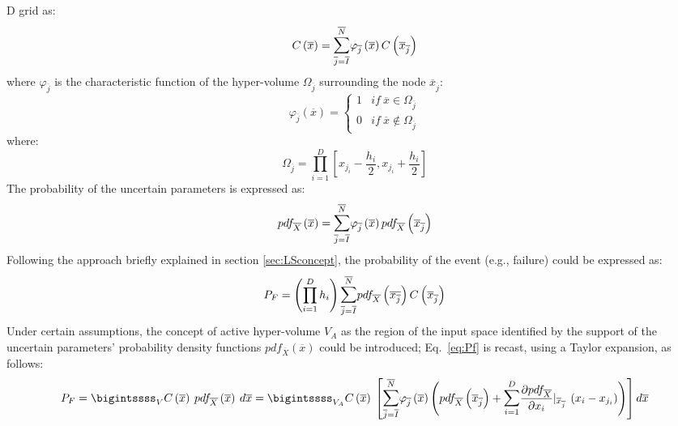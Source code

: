 D grid as:
\begin{equation}
C\left ( \overline{x} \right ) = 
\mathlarger{\sum}_{\overline{j}=\overline{I}}^{\overline{N}} \varphi_{\overline{j}}\left 
( \overline{x} \right ) C\left ( \overline{x}_{\overline{j}} \right )
\end{equation}
where $\varphi_{\overline{j}}$ is the characteristic function of the hyper-volume $\Omega_{\overline{j}}$ surrounding the node 
 $\overline{x}_{\overline{j}}$:
 \begin{equation}
 \varphi_{\overline{j}}\left ( \overline{x} \right ) = 
\left\{\begin{matrix}
1 & if \: \overline{x} \in \Omega_{\overline{j}} \\ 
0 & if \: \overline{x} \notin \Omega_{\overline{j}} 
\end{matrix}\right.
\end{equation}
where:
 \begin{equation}
 \label{eq:OmegaEq}
 \Omega_{\overline{j}} = \prod_{i=1}^{D}\left [ x_{j_{i}} - \frac{h_{i}}{2}, 
 x_{j_{i}} + \frac{h_{i}}{2}  \right ]
 \end{equation}
 The probability of the uncertain parameters is expressed as:
 \begin{equation} 
 pdf_{\overline{X}}\left ( \overline{x} \right ) = 
\mathlarger{\sum}_{\overline{j}=\overline{I}}^{\overline{N}}
\varphi_{\overline{j}}\left ( \overline{x} \right )
pdf_{\overline{X}}\left ( \overline{x}_{\overline{j}} \right )
 \end{equation}
Following the approach briefly explained in section 
\ref{sec:LSconcept}, the probability of the event (e.g., failure) could be 
expressed as: 
 \begin{equation} 
 \label{eq:Pf}
  P_{F}=\left ( \prod_{i=1}^{D}h_{i} \right ) 
  \mathlarger{\sum}_{\overline{j}=
  \overline{I}}^{\overline{N}}pdf_{\overline{X}}\left ( 
  \overline{x_{\overline{j}}} \right )
  C\left ( \overline{x}_{\overline{j}} \right )
 \end{equation}
Under certain assumptions, the concept of active hyper-volume 
$V_{A}$ as the region of the input space identified by the support of 
the uncertain parameters’ probability density functions 
$pdf_{\overline{X}}\left ( \overline{x} \right )$ could be introduced; 
Eq.~\ref{eq:Pf} is recast, using a Taylor expansion, as follows: 
 \begin{equation} 
P_{F}= \bigintssss_{V} C\left ( \overline{x} \right )\: pdf_{\overline{X}}\left ( 
\overline{x}  \right )\: d\overline{x} =\bigintssss_{V_{A}}C\left ( \overline{x} 
\right )\: 
\left [  
\mathlarger{\sum}_{\overline{j}=\overline{I}}^{\overline{N}}\varphi_{\overline{j}}\left ( 
\overline{x} \right )
\left ( pdf_{\overline{X}}\left ( \overline{x}_{\overline{j}} \right ) +
\mathlarger{\sum}_{i=1}^{D} \frac{\partial pdf_{\overline{X}}}{\partial x_{i}}|
_{\overline{x}_{\overline{j}}} \: \left ( x_{i} - x_{j_{i}} \right ) \right ) \right 
] d\overline{x}
 \end{equation}
